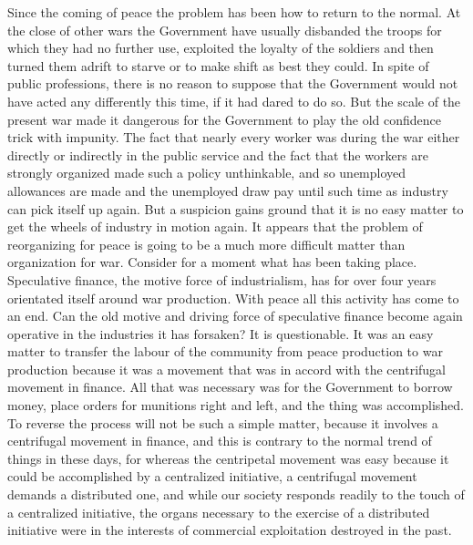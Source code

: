 \documentclass{book}
\begin{document}
Since the coming of peace the problem has been how to return to the normal. At the close of other wars the Government have usually disbanded the troops for which they had no further use, exploited the loyalty of the soldiers and then turned them adrift to starve or to make shift as best they could. In spite of public professions, there is no reason to suppose that the Government would not have acted any differently this time, if it had dared to do so. But the scale of the present war made it dangerous for the Government to play the old confidence trick with impunity. The fact that nearly every worker was during the war either directly or indirectly in the public service and the fact that the workers are strongly organized made such a policy unthinkable, and so unemployed allowances are made and the unemployed draw pay until such time as industry can pick itself up again. But a suspicion gains ground that it is no easy matter to get the wheels of industry in motion again. It appears that the problem of reorganizing for peace is going to be a much more difficult matter than organization for war. Consider for a moment what has been taking place. Speculative finance, the motive force of industrialism, has for over four years orientated itself around war production. With peace all this activity has come to an end. Can the old motive and driving force of speculative finance become again operative in the industries it has forsaken? It is questionable. It was an easy matter to transfer the labour of the community from peace production to war production because it was a movement that was in accord with the centrifugal movement in finance. All that was necessary was for the Government to borrow money, place orders for munitions right and left, and the thing was accomplished. To reverse the process will not be such a simple matter, because it involves a centrifugal movement in finance, and this is contrary to the normal trend of things in these days, for whereas the centripetal movement was easy because it could be accomplished by a centralized initiative, a centrifugal movement demands a distributed one, and while our society responds readily to the touch of a centralized initiative, the organs necessary to the exercise of a distributed initiative were in the interests of commercial exploitation destroyed in the past.
\end{document}
